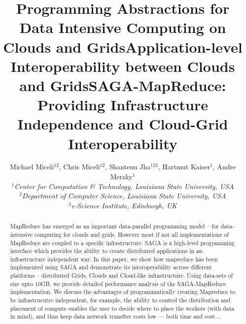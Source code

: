 \documentclass[conference,final]{IEEEtran}
\title{Programming Abstractions for Data Intensive Computing on Clouds and Grids}
\title{Application-level Interoperability between Clouds and Grids}
\title{SAGA-MapReduce: Providing Infrastructure Independence and
  Cloud-Grid Interoperability}
\author{Michael Miceli$^{12}$, Chris Miceli$^{12}$, Shantenu Jha$^{123}$,
  Hartmut Kaiser$^{1}$, Andre Merzky$^{1}$\\
  \small{\emph{$^{1}$Center for Computation \& Technology, Louisiana
      State University, USA}}\\
  \small{\emph{$^{2}$Department of Computer Science, Louisiana State
      University, USA}}\\
  \small{\emph{$^{3}$e-Science Institute, Edinburgh, UK}}\\
}
\begin{document}
\maketitle

\begin{abstract}
  MapReduce has emerged as an important data-parallel programming
  model -- for data-intensive computing for clouds and grids. However
  most if not all implementations of MapReduce are coupled to a
  specific infrastructure.  SAGA is a high-level programming interface
  which provides the ability to create distributed applications in an
  infrastructure independent way. In this paper, we show how mapreduce
  has been implemented using SAGA and demonstrate its interoperability
  across different platforms -- distributed Grids, Clouds and
  Cloud-like infrastructure. Using data-sets of size upto 10GB, we
  provide detailed performance analysis of the SAGA-MapReduce
  implementation.  We discuss the advantages of programmatically
  creating Mapreduce to be infrastrucutre independent, for example,
  the ability to control the distribution and placement of compute
  enables the user to decide where to place the workers (with data in
  mind), and thus keep data network transfter costs low --- both time
  and cost....
\end{abstract}

\end{document}
